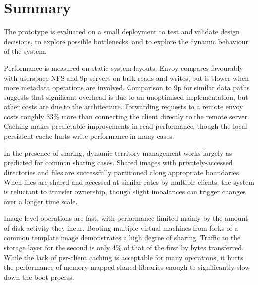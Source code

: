 \section{Summary}

The prototype is evaluated on a small deployment to test and validate design decisions, to explore possible bottlenecks, and to explore the dynamic behaviour of the system.

Performance is measured on static system layouts. Envoy compares favourably with userspace NFS and 9p servers on bulk reads and writes, but is slower when more metadata operations are involved. Comparison to 9p for similar data paths suggests that significant overhead is due to an unoptimised implementation, but other costs are due to the architecture. Forwarding requests to a remote envoy costs roughly 33\% more than connecting the client directly to the remote server. Caching makes predictable improvements in read performance, though the local persistent cache hurts write performance in many cases.

In the presence of sharing, dynamic territory management works largely as predicted for common sharing cases. Shared images with privately-accessed directories and files are successfully partitioned along appropriate boundaries. When files are shared and accessed at similar rates by multiple clients, the system is reluctant to transfer ownership, though slight imbalances can trigger changes over a longer time scale.

Image-level operations are fast, with performance limited mainly by the amount of disk activity they incur. Booting multiple virtual machines from forks of a common template image demonstrates a high degree of sharing. Traffic to the storage layer for the second is only 4\% of that of the first by bytes transferred. While the lack of per-client caching is acceptable for many operations, it hurts the performance of memory-mapped shared libraries enough to significantly slow down the boot process.
